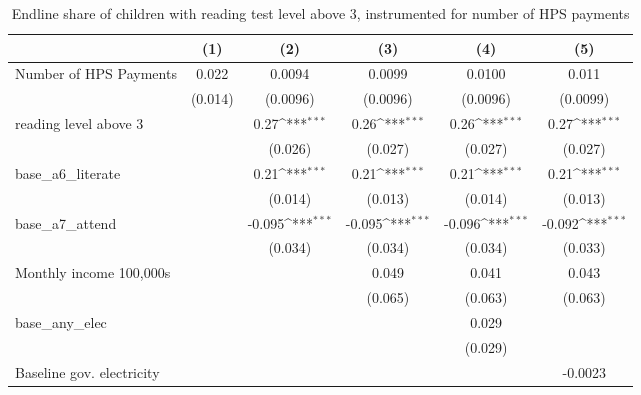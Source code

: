 \begin{table}[htbp]\centering
\def\sym#1{\ifmmode^{#1}\else\(^{#1}\)\fi}
\caption{Endline share of children with reading test level above 3, instrumented for number of HPS payments}
\begin{tabular*}{1\hsize}{@{\hskip\tabcolsep\extracolsep\fill}l*{5}{c}}
\toprule
                &\multicolumn{1}{c}{(1)}         &\multicolumn{1}{c}{(2)}         &\multicolumn{1}{c}{(3)}         &\multicolumn{1}{c}{(4)}         &\multicolumn{1}{c}{(5)}         \\
\midrule
Number of HPS Payments&    0.022         &   0.0094         &   0.0099         &   0.0100         &    0.011         \\
                &  (0.014)         & (0.0096)         & (0.0096)         & (0.0096)         & (0.0099)         \\
reading level above 3&                  &     0.27\sym{***}&     0.26\sym{***}&     0.26\sym{***}&     0.27\sym{***}\\
                &                  &  (0.026)         &  (0.027)         &  (0.027)         &  (0.027)         \\
base\_a6\_literate&                  &     0.21\sym{***}&     0.21\sym{***}&     0.21\sym{***}&     0.21\sym{***}\\
                &                  &  (0.014)         &  (0.013)         &  (0.014)         &  (0.013)         \\
base\_a7\_attend  &                  &   -0.095\sym{***}&   -0.095\sym{***}&   -0.096\sym{***}&   -0.092\sym{***}\\
                &                  &  (0.034)         &  (0.034)         &  (0.034)         &  (0.033)         \\
Monthly income 100,000s&                  &                  &    0.049         &    0.041         &    0.043         \\
                &                  &                  &  (0.065)         &  (0.063)         &  (0.063)         \\
base\_any\_elec   &                  &                  &                  &    0.029         &                  \\
                &                  &                  &                  &  (0.029)         &                  \\
Baseline gov. electricity&                  &                  &                  &                  &  -0.0023         \\

\end{tabular*}
\end{table}
